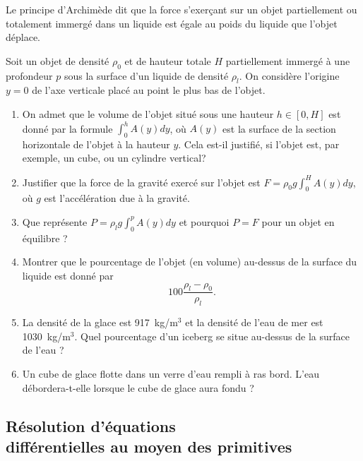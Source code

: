 \begin{exo}


    Le principe d'Archimède dit que la force s'exerçant sur un objet partiellement ou totalement immergé dans un liquide est égale au poids du liquide que l'objet déplace.

    Soit un objet de densité $\rho_0$ et de hauteur totale ${H}$ partiellement immergé à une profondeur ${p}$ sous la surface d'un liquide de densité $\rho_l$. On considère l'origine $y=0$ de l'axe verticale placé au point le plus bas de l'objet.

    \begin{enumerate}
        \item On admet que le volume de l'objet situé sous une hauteur $h \in [0,H]$ est donné par la formule $\int_{0}^{h} A(y) dy$, où $A(y)$ est la surface de la section horizontale de l'objet à la hauteur $y$.
        Cela est-il justifié, si l'objet est, par exemple, un cube, ou un cylindre vertical?
        \item Justifier que la force de la gravité exercé sur l'objet est $F= \rho_0 g \int_{0}^{H} A(y) dy$, où $g$ est l'accélération due à la gravité.
        \item Que représente $P= \rho_l g \int_{0}^{p} A(y) dy$ et pourquoi $P=F$ pour un objet en équilibre ?
        \item Montrer que le pourcentage de l'objet (en volume) au-dessus de la surface du liquide est donné par
        $$
            100\frac {\rho_l-\rho_0} {\rho_l}.
        $$
        \item La densité de la glace est {917}~{kg/m$^3$} et la densité de l'eau de mer est {1030}~{kg/m$^3$}. Quel pourcentage d'un iceberg se situe au-dessus de la surface de l'eau ?
        \item Un cube de glace flotte dans un verre d'eau rempli à ras bord. L'eau débordera-t-elle lorsque le cube de glace aura fondu ?
    \end{enumerate}
\end{exo}

\subsection{Résolution d'équations\\ différentielles  au moyen des primitives}



